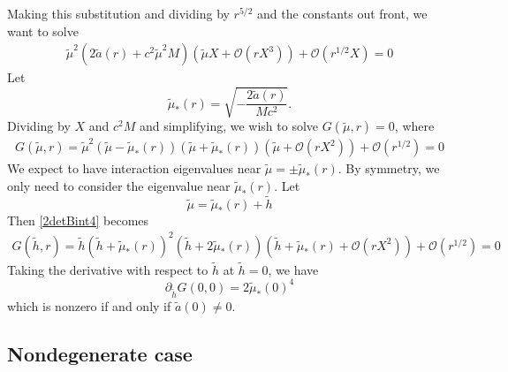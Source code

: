 \documentclass[thesis.tex]{subfiles}
\begin{document}
Making this substitution and dividing by $r^{5/2}$ and the constants out front, we want to solve
\begin{equation}\label{2detBint4}
\begin{aligned}
\tilde{\mu}^2 (2\tilde{a}(r) + c^2 \tilde{\mu}^2 M)\left( \tilde{\mu} X + \mathcal{O}(r X^3)\right) + \mathcal{O}( r^{1/2} X ) = 0
\end{aligned}
\end{equation}
Let 
\[
\tilde{\mu}_*(r) = \sqrt{-\frac{2\tilde{a}(r)}{M c^2}}.
\]
Dividing by $X$ and $c^2 M$ and simplifying, we wish to solve $G(\tilde{\mu},r) = 0$, where
\begin{equation}\label{2detBint4}
\begin{aligned}
G(\tilde{\mu},r) = \tilde{\mu}^2 (\tilde{\mu} - \tilde{\mu}_*(r))(\tilde{\mu} + \tilde{\mu}_*(r))\left( \tilde{\mu} + \mathcal{O}(r X^2)\right) + \mathcal{O}( r^{1/2} ) = 0
\end{aligned}
\end{equation}
We expect to have interaction eigenvalues near $\tilde{\mu} = \pm \tilde{\mu}_*(r)$. By symmetry, we only need to consider the eigenvalue near $\tilde{\mu}_*(r)$. Let
\[
\tilde{\mu} = \tilde{\mu}_*(r) + \tilde{h}
\]
Then \cref{2detBint4} becomes
\begin{equation}\label{2detBint5}
\begin{aligned}
G(\tilde{h},r) = \tilde{h} ( \tilde{h} + \tilde{\mu}_*(r))^2 (\tilde{h} + 2 \tilde{\mu}_*(r))\left(\tilde{h} + \tilde{\mu}_*(r) + \mathcal{O}(r X^2)\right) + \mathcal{O}( r^{1/2} ) = 0
\end{aligned}
\end{equation}
Taking the derivative with respect to $\tilde{h}$ at $\tilde{h} = 0$, we have
\[
\partial_{\tilde{h}} G(0, 0) = 2 \tilde{\mu}_*(0)^4 
\]
which is nonzero if and only if $\tilde{a}(0) \neq 0$.

\subsection{Nondegenerate case}
\end{document}
